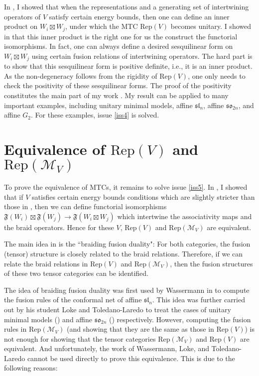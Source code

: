 \documentclass[10pt]{amsart}
\theoremstyle{definition}
\theoremstyle{plain}
\newcommand{\Rep}{\mathrm{Rep}}
\begin{document}
In \cite{G unitary1,G unitary2}, I showed that when the representations and a generating set of intertwining operators of $V$ satisfy certain energy bounds, then one can define an inner product on $W_i\boxtimes W_j$, under which the MTC $\Rep(V)$ becomes unitary. I showed in \cite{G equivalence} that this inner product is the right one for us the construct the functorial isomorphisms. In fact, one can always define a desired sesquilinear form on $W_i\boxtimes W_j$ using certain fusion relations of intertwining operators. The hard part is to show that this sesquilinear form is positive definite, i.e., it is an inner product. As the non-degeneracy follows from the rigidity of $\Rep(V)$, one only needs to check the positivity of these sesquilinear forms. The proof of the positivity constitutes the main part of my work \cite{G unitary1,G unitary2}. My result can be applied to many important examples, including unitary minimal models, affine $\mathfrak{sl}_n$, affine $\mathfrak {so}_{2n}$, and affine $G_2$. For these examples, issue \ref{iss4} is solved.


\section{Equivalence of $\Rep(V)$ and $\Rep(\mathcal M_V)$}



To  prove the equivalence of MTCs, it remains to solve issue \ref{iss5}. In \cite{G equivalence}, I showed that if $V$ satisfies certain energy bounds conditions which are slightly stricter than those in \cite{G unitary1,G unitary2}, then we can define  functorial isomorphisms $\mathfrak F(W_i)\boxtimes\mathfrak F(W_j)\rightarrow \mathfrak F(W_i\boxtimes W_j)$ which intertwine the associativity maps and the braid operators. Hence for these $V$, $\Rep(V)$ and $\Rep(\mathcal M_V)$ are equivalent.

The main idea in \cite{G equivalence} is the ``braiding fusion duality": For both categories, the fusion (tensor) structure is closely related to the braid relations. Therefore, if we can relate the braid relations in $\Rep(V)$ and  $\Rep(\mathcal M_V)$, then the fusion structures of these two tensor categories can be identified. 

The idea of braiding fusion duality was first used by Wassermann in  \cite{Wass} to compute the fusion rules of the conformal net of affine $\mathfrak {sl}_n$. This idea was further carried out by his student Loke and Toledano-Laredo to treat the cases of unitary minimal models (\cite{Loke}) and affine $\mathfrak {so}_{2n}$ (\cite{Toledano}) respectively. However, computing the fusion rules in $\Rep(\mathcal M_V)$ (and showing that they are the same as those in $\Rep(V)$) is not enough for showing that the tensor categories $\Rep(\mathcal M_V)$ and $\Rep(V)$ are equivalent. And unfortunately, the work of Wassermann, Loke, and Toledano-Laredo cannot be used directly to prove this equivalence. This is due to the following reasons:
\end{document}
